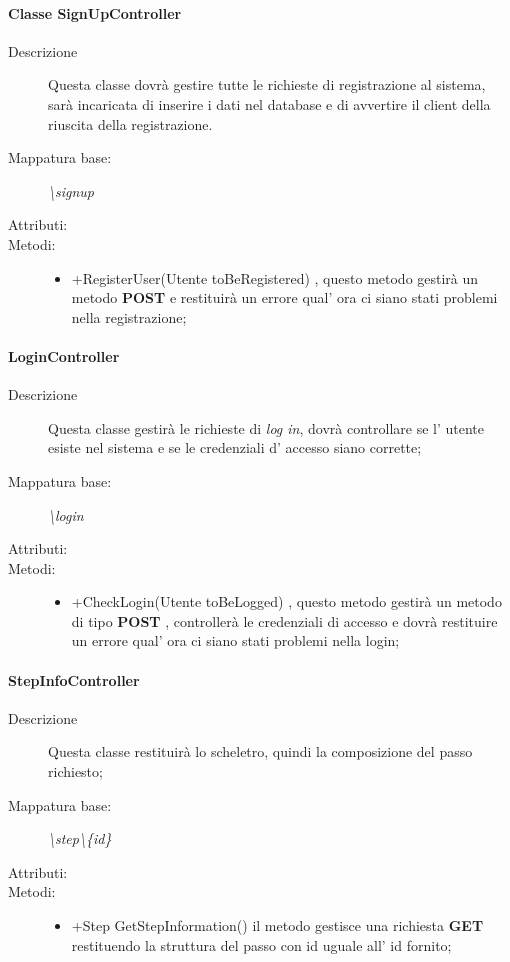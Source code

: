 \paragraph{Classe SignUpController}%
\begin{description}
	\item[Descrizione] Questa classe dovrà gestire tutte le richieste di registrazione al sistema, sarà incaricata di inserire i dati nel database e di avvertire il client della riuscita della registrazione.
	\item[Mappatura base:] \textit{\textbackslash signup}
	\item[Attributi:]
	\item[Metodi:]\begin{itemize}
					\item +RegisterUser(Utente toBeRegistered) , questo metodo gestirà un metodo \textbf{POST} e restituirà un errore qual' ora ci siano stati problemi nella registrazione;
				\end{itemize}
\end{description}
\paragraph{LoginController}%
\begin{description}
	\item[Descrizione] Questa classe gestirà le richieste di \textit{log in}, dovrà controllare se l' utente esiste nel sistema e se le credenziali d' accesso siano corrette;
	\item[Mappatura base:] \textit{\textbackslash login}
	\item[Attributi:]
	\item[Metodi:]\begin{itemize}
					\item +CheckLogin(Utente toBeLogged) , questo metodo gestirà un metodo di tipo \textbf{POST} , controllerà le credenziali di accesso e dovrà restituire un errore qual' ora ci siano stati problemi nella login;
				\end{itemize}
\end{description}
\paragraph{StepInfoController}%
\begin{description}
	\item[Descrizione] Questa classe restituirà lo scheletro, quindi la composizione del passo richiesto;
	\item[Mappatura base:] \textit{\textbackslash step\textbackslash \{id\}}
	\item[Attributi:]
	\item[Metodi:]\begin{itemize}
					\item +Step GetStepInformation() il metodo gestisce una richiesta \textbf{GET} restituendo la struttura del passo con id uguale all' id fornito;
				\end{itemize}
\end{description}
